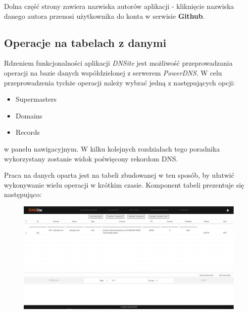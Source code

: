 \documentclass[12pt] {article}
\begin{document}
Dolna część strony zawiera nazwiska autorów aplikacji - kliknięcie nazwiska danego autora przenosi użytkownika do konta w serwisie \textbf{Github}.

\subsection{Operacje na tabelach z danymi}
Rdzeniem funkcjonalności aplikacji \emph{DNSite} jest możliwość przeprowadzania operacji na bazie danych współdzielonej z serwerem \emph{PowerDNS}. W celu przeprowadzenia tychże operacji należy wybrać jedną z następujących opcji:
\begin{itemize}
\item Supermasters
\item Domains
\item Records
\end{itemize}
w panelu nawigacyjnym. W kilku kolejnych rozdziałach tego poradnika wykorzystany zostanie widok poświęcony rekordom DNS.

Praca na danych oparta jest na tabeli zbudowanej w ten sposób, by ułatwić wykonywanie wielu operacji w krótkim czasie. Komponent tabeli prezentuje się następująco:
\begin{figure}[H]
\centering
\includegraphics[width=\textwidth]{res/x_tabela}
\end{figure}
\end{document}

